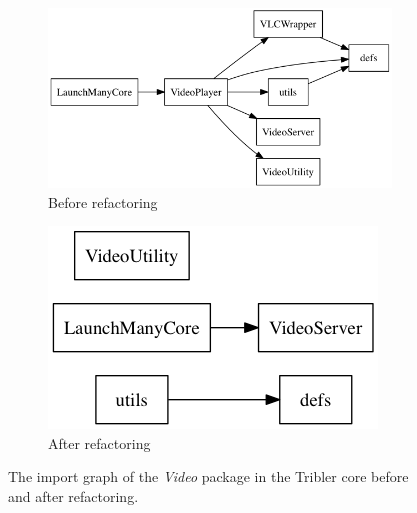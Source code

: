 \begin{figure}
	\centering
	\begin{subfigure}{.5\textwidth}
		\centering
		\includegraphics[width=.9\linewidth]{images/implementation/output_video_nov15}
		\caption{Before refactoring}
		\label{fig:video-package-refactoring-before}
	\end{subfigure}%
	\begin{subfigure}{.5\textwidth}
		\centering
		\includegraphics[width=.7\linewidth]{images/implementation/output_video_july16}
		\caption{After refactoring}
		\label{fig:video-package-refactoring-after}
	\end{subfigure}
	\caption{The import graph of the \emph{Video} package in the Tribler core before and after refactoring.}
	\label{fig:video-package-refactoring}
\end{figure}


